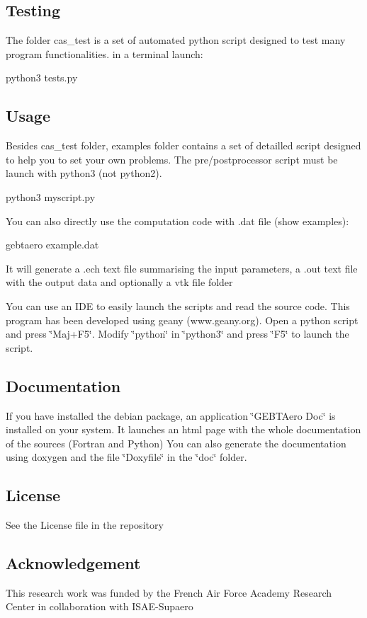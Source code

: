 \subsection*{Testing}

The folder cas\+\_\+test is a set of automated python script designed to test many program functionalities. in a terminal launch\+: 
\begin{DoxyCode}
python3 tests.py
\end{DoxyCode}


\subsection*{Usage}

Besides cas\+\_\+test folder, examples folder contains a set of detailled script designed to help you to set your own problems. The pre/postprocessor script must be launch with python3 (not python2). 
\begin{DoxyCode}
python3 myscript.py
\end{DoxyCode}
 You can also directly use the computation code with .dat file (show examples)\+: 
\begin{DoxyCode}
gebtaero example.dat
\end{DoxyCode}
 It will generate a .ech text file summarising the input parameters, a .out text file with the output data and optionally a vtk file folder

You can use an I\+DE to easily launch the scripts and read the source code. This program has been developed using geany (www.\+geany.\+org). Open a python script and press \char`\"{}\+Maj+\+F5\char`\"{}. Modify \char`\"{}python\char`\"{} in \char`\"{}python3\char`\"{} and press \char`\"{}\+F5\char`\"{} to launch the script.

\subsection*{Documentation}

If you have installed the debian package, an application \char`\"{}\+G\+E\+B\+T\+Aero Doc\char`\"{} is installed on your system. It launches an html page with the whole documentation of the sources (Fortran and Python) You can also generate the documentation using doxygen and the file \char`\"{}\+Doxyfile\char`\"{} in the \char`\"{}doc\char`\"{} folder.

\subsection*{License}

See the License file in the repository

\subsection*{Acknowledgement}

This research work was funded by the French Air Force Academy Research Center in collaboration with I\+S\+A\+E-\/\+Supaero 